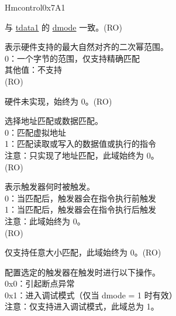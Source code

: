 \begin{register}{H}{mcontrol}{0x7A1}\label{regdesc:LPMCONTROL}
%
%
%
%
%
%
%
%
%
%
%
%
%
%
%
%
%
\regnewline%
\begin{regdesc}\begin{reglist}
\label{fielddesc:LPMCONTROLDMODE}\item [dmode] 与 \hyperref[regdesc:LPTDATA1]{tdata1} 的 \hyperref[fielddesc:LPTDATA1DMODE]{dmode} 一致。(RO)
\label{fielddesc:LPMCONTROLMASKMAX}\item [maskmax] 表示硬件支持的最大自然对齐的二次幂范围。\\
0：一个字节的范围，仅支持精确匹配\\
其他值：不支持\\
(RO)
\label{fielddesc:LPMCONTROLHIT}\item [hit] 硬件未实现，始终为 0。(RO)
\label{fielddesc:LPMCONTROLSELECT}\item [select] 选择地址匹配或数据匹配。\\
0：匹配虚拟地址\\
1：匹配读取或写入的数据值或执行的指令\\
注意：只实现了地址匹配，此域始终为 0。\\
(RO)
\label{fielddesc:LPMCONTROLTIMING}\item [timing] 表示触发器何时被触发。\\
0：当匹配后，触发器会在指令执行前触发\\
1：当匹配后，触发器会在指令执行后触发\\
注意：此域始终为 0。 \\
(RO)
\label{fielddesc:LPMCONTROLSIZELO}\item [sizelo] 仅支持任意大小匹配，此域始终为 0。(RO)
\label{fielddesc:LPMCONTROLACTION}\item [action] 配置选定的触发器在触发时进行以下操作。\\
0x0：引起断点异常\\
0x1：进入调试模式（仅当 dmode = 1 时有效）\\
注意：仅支持进入调试模式，此域总为 1。\\

\end{reglist}
\end{regdesc}
\end{register}
